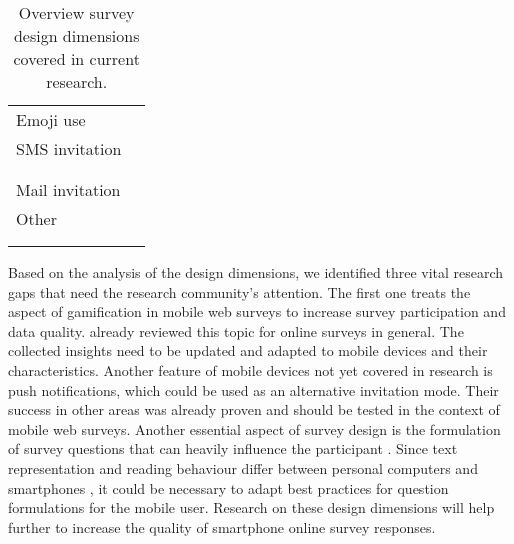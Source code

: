 \begin{table}
\begin{tabular}{ll}
    	Emoji  use & \cite{bacon_how_2017, bosch_using_2021}\\
    	SMS invitation & \cite{de_bruijne_comparing_2013, mavletova_data_2013}\\
    	& \cite{bucher_exploring_2021, de_bruijne_improving_2014}\\
    	& \cite{schlosser_mobile_2018, mavletova_mobile_2014}\\
    	Mail invitation & \cite{lugtig_recruiting_2019}\\
    	Other & \cite{antoun_effects_2017, wang_experimentation_2017}\\
    	& \cite{krebs_exploring_2021, mavletova_grouping_2016}\\
    	& \cite{maineri_slider_2021, revilla_testing_2018}\\
		\bottomrule 
	\end{tabular}
	\caption{Overview survey design dimensions covered in current research.}
	\label{tab: design}
\end{table}

Based on the analysis of the design dimensions, we identified three vital research gaps that need the research community's attention. The first one treats the aspect of gamification in mobile web surveys to increase survey participation and data quality. \cite{keusch_review_2015} already reviewed this topic for online surveys in general. The collected insights need to be updated and adapted to mobile devices and their characteristics. Another feature of mobile devices not yet covered in research is push notifications, which could be used as an alternative invitation mode. Their success in other areas was already proven \cite{stroud_effects_2019, pham_effects_2016} and should be tested in the context of mobile web surveys. Another essential aspect of survey design is the formulation of survey questions that can heavily influence the participant \cite{tourangeau_psychology_2000}. Since text representation and reading behaviour differ between personal computers and smartphones \cite{liu_reading_2016}, it could be necessary to adapt best practices for question formulations for the mobile user. Research on these design dimensions will help further to increase the quality of smartphone online survey responses.  